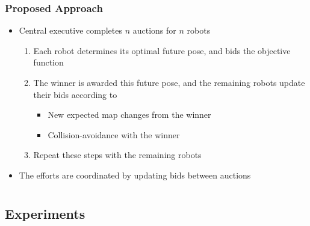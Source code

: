 \documentclass[11pt,professionalfonts,hyperref={pdftex,pdfpagemode=none,pdfstartview=FitH}]{beamer}
\begin{document}
\begin{frame}
\frametitle{Proposed Approach}

\begin{itemize}
\item Central executive completes $n$ auctions for $n$ robots
\begin{enumerate}
	\item Each robot determines its optimal future pose, and bids the objective function
	\item The winner is awarded this future pose, and the remaining robots update their bids according to
	\begin{itemize}
		\item New expected map changes from the winner
		\item Collision-avoidance with the winner
	\end{itemize}
	\item Repeat these steps with the remaining robots
\end{enumerate}
\item The efforts are coordinated by updating bids between auctions
\end{itemize}
\end{frame}

%
%
%
%


\section*{}
\subsection*{Experiments}
\end{document}
